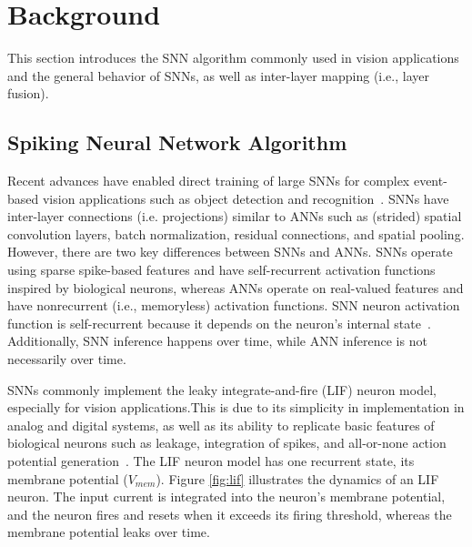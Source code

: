 
\section{Background}\label{sec:background}

This section introduces the SNN algorithm commonly used in vision applications and the general behavior of SNNs, as well as inter-layer mapping (i.e., layer fusion). 

\subsection{Spiking Neural Network Algorithm}

Recent advances have enabled direct training of large SNNs for complex event-based vision applications such as object detection and recognition~\cite{sewresnet, 10376840}. SNNs have inter-layer connections (i.e. projections) similar to ANNs such as (strided) spatial convolution layers, batch normalization, residual connections, and spatial pooling. However, there are two key differences between SNNs and ANNs. SNNs operate using sparse spike-based features and have self-recurrent activation functions inspired by biological neurons, whereas ANNs operate on real-valued features and have nonrecurrent (i.e., memoryless) activation functions. SNN neuron activation function is self-recurrent because it depends on the neuron's internal state~\cite{8891809}. Additionally, SNN inference happens over time, while ANN inference is not necessarily over time.  %

SNNs commonly implement the leaky integrate-and-fire (LIF) neuron model, especially for vision applications.This is due to its simplicity in implementation in analog and digital systems, as well as its ability to replicate basic features of biological neurons such as leakage, integration of spikes, and all-or-none action potential generation~\cite{gerstner2014neuronal}. The LIF neuron model has one recurrent state, its membrane potential ($V_{mem}$). Figure \ref{fig:lif} illustrates the dynamics of an LIF neuron. The input current is integrated into the neuron's membrane potential, and the neuron fires and resets when it exceeds its firing threshold, whereas the membrane potential leaks over time.


